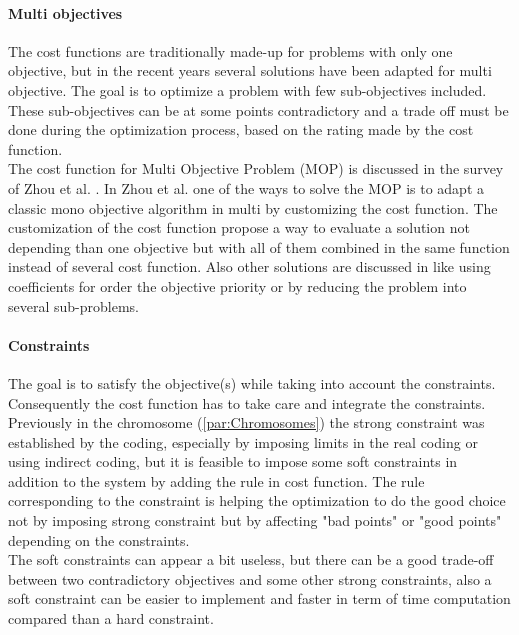 \paragraph*{Multi objectives}
The cost functions are traditionally made-up for  problems with only one objective, but in the recent years several solutions have been adapted for multi objective. The goal is to optimize a problem with few sub-objectives included. These sub-objectives can be at some points contradictory and a trade off must be done during the optimization process, based on the rating made by the cost function. \\
 The cost function for Multi Objective Problem (MOP) is discussed in the survey of Zhou et al. \cite{75*zhou2011}. In Zhou et al. \cite{75*zhou2011} one of the ways to solve the MOP is to adapt a classic mono objective algorithm in multi by customizing the cost function. The customization of the cost function propose a way to evaluate a solution not depending than one objective but with all of them combined in the same function instead of several cost function. 
 Also other solutions are discussed in \cite{75*zhou2011} like using coefficients for order the objective priority or by reducing the problem into several sub-problems. \\ %

\paragraph*{Constraints}
The goal is to satisfy the objective(s) while taking into account the constraints. Consequently the cost function has to take care and integrate the constraints. 
 Previously in the chromosome (\ref{par:Chromosomes}) the strong constraint was established by the coding, especially by imposing limits in the real coding or using indirect coding, but it is feasible to impose some soft constraints in addition to the system by adding the rule in cost function. The rule corresponding to the constraint is helping the optimization to do the good choice not by imposing strong constraint but by affecting "bad points" or "good points" depending on the constraints. \\
 The soft constraints can appear a bit useless, but there can be a good trade-off between two contradictory objectives and some other strong constraints, also a soft constraint can be easier to implement and faster in term of time computation compared than a hard constraint.  

